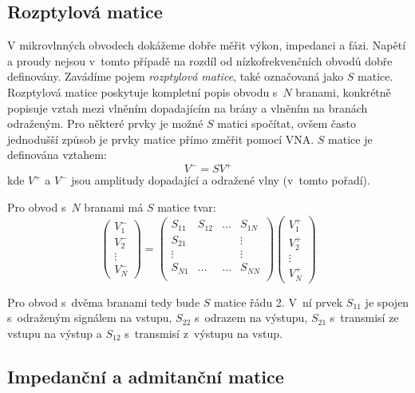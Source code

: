 \documentclass{protokol}
\begin{document}
\subsection{Rozptylová matice}

V mikrovlnných obvodech dokážeme dobře měřit výkon, impedanci a fázi. 
Napětí a proudy nejsou v~tomto případě na rozdíl od nízkofrekvenčních obvodů
dobře definovány.
Zavádíme pojem \emph{rozptylová matice}, také označovaná jako $S$ matice.
Rozptylová matice poskytuje kompletní popis obvodu s~$N$ branami,
konkrétně popisuje vztah mezi vlněním dopadajícím na brány
a vlněním na branách odraženým.
Pro některé prvky je možné $S$ matici spočítat,
ovšem často jednodušší způsob je prvky matice přímo změřit pomocí VNA.
$S$ matice je definována vztahem:
\begin{equation}
	\label{eq:smatrix-short}
	V^- = S V^+
\end{equation}
kde $V^+$ a $V^-$ jsou amplitudy dopadající a odražené vlny
(v~tomto pořadí).

Pro obvod s~$N$ branami má $S$ matice tvar:
\begin{equation}
	\label{eq:smatrix-full}
	\begin{pmatrix}
		V_1^-  \\
		V_2^-  \\
		\vdots \\
		V_N^-
	\end{pmatrix}
	=
	\begin{pmatrix}
		S_{11} & S_{12} & \dots & S_{1N} \\
		S_{21} &        &       & \vdots \\
		\vdots &        &       & \vdots \\
		S_{N1} & \dots	& \dots & S_{NN} \\
	\end{pmatrix}
	\begin{pmatrix}
		V_1^+  \\
		V_2^+  \\
		\vdots \\
		V_N^+
	\end{pmatrix}
\end{equation}

Pro obvod s~dvěma branami tedy bude $S$ matice řádu 2.
V~ní prvek $S_{11}$ je spojen s~odraženým signálem na vstupu,
$S_{22}$ s~odrazem na výstupu,
$S_{21}$ s~transmisí ze vstupu na výstup
a $S_{12}$ s~transmisí z~výstupu na vstup.

\subsection{Impedanční a admitanční matice}
\end{document}
